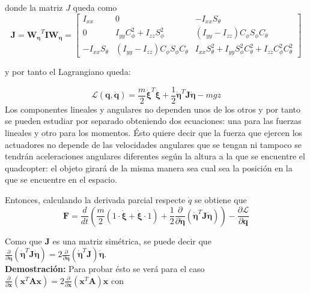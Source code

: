 \documentclass[twoside]{article}
\begin{document}
donde la matriz $J$ queda como
\begin{equation}
\pmb{J}=\pmb{W_\eta} ^{T}\pmb{I}\pmb{W_\eta} = \left[ \begin{array}{ccc}
I_{xx} & 0 & -I_{xx} S_\theta \\
0 & I_{yy} C^2_\phi + I_{zz} S^2_\phi & (I_{yy}-I_{zz}) C_{\phi} S_\phi C_\theta \\
-I_{xx} S_\theta & (I_{yy}-I_{zz}) C_{\phi} S_\phi C_\theta & I_{xx} S^2_{\theta}+I_{yy} S^2_{\phi} C^2_\theta +I_{zz}C^2_{\phi} C^2_{\theta}
\end{array} \right]
\end{equation} 

y por tanto el Lagrangiano queda:

\begin{equation}
\mathcal{L}(\pmb{q},\pmb{\dot{q}})=\frac{m}{2} \pmb{\dot{\xi}}^T \pmb{\dot{\xi}} + \frac{1}{2}\pmb{\dot{\eta}}^{T}\pmb{J}\pmb{\dot{\eta}} - mgz
\end{equation}
Los componentes lineales y angulares no dependen unos de los otros y por tanto se pueden estudiar por separado obteniendo dos ecuaciones: una para las fuerzas lineales y otro para los momentos. Ésto quiere decir que la fuerza que ejercen los actuadores no depende de las velocidades angulares que se tengan ni tampoco se tendrán aceleraciones angulares diferentes según la altura a la que se encuentre el quadcopter: el objeto girará de la misma manera sea cual sea la  posición en la que se encuentre en el espacio.

Entonces, calculando la derivada parcial respecte $\dot{q}$ se obtiene que 
\begin{equation}
\pmb{F}=\frac{d}{dt}\left(\frac{m}{2}(1\cdot \pmb{ \dot{\xi}}+\pmb{\dot{\xi}}\cdot 1)+\frac{1}{2}\frac{\partial}{\partial \pmb{\dot{\eta}}}(\pmb{\dot{\eta}}^{T}\pmb{J}\pmb{\dot{\eta}})\right)-\frac{\partial \mathcal{L}}{\partial \pmb{q}}
\end{equation}

Como que $\pmb{J}$ es una matriz simétrica, se puede decir que  $\frac{\partial}{\partial \pmb{\dot{\eta}}}(\pmb{\dot{\eta}}^{T}\pmb{J}\pmb{\dot{\eta}})=2 \frac{\partial}{\partial \pmb{\dot{\eta}}}(\pmb{\dot{\eta}}^{T}\pmb{J})\pmb{\dot{\eta}} $. \\

\textbf{Demostración:} Para probar ésto se verá para el caso $\frac{\partial}{\partial \pmb{x}}(\pmb{x}^{T}\pmb{A}\pmb{x})=2 \frac{\partial}{\partial \pmb{x}}(\pmb{x}^{T}\pmb{A})\pmb{x} $ con 
\end{document}
